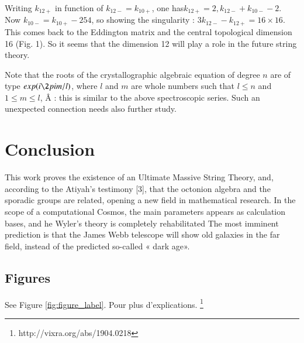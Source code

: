 \documentclass[a4paper,9pt]{article}
\begin{document}
    
    Writing $k_{12+}$ in function of $k_{12-} = k_{10+}$, one has$ k_{12+} = 2,  k_{12-} + k_{10-} - 2$. Now   $k_{10-} = k_{10+} - 254$, so showing the singularity : $3k_{12-} - k_{12+}  = 16 \times 16$. This comes back to the Eddington matrix and the central topological dimension 16 (Fig. 1). So it seems that the dimension 12 will play a role in the future string theory.
    
    
    Note that the roots of the crystallographic algebraic equation of degree $n$ are of type $exp(i\2pi m/l)$, where $l$ and $m$ are whole numbers such that $l \le n$ and $1 \le m \le l$, Â : this is similar to the above spectroscopic series. Such an unexpected connection needs also further study.


\section{Conclusion}

This work proves the existence of an Ultimate Massive String Theory, and, according to the Atiyah's testimony [3], that the octonion algebra and the sporadic groups are related, opening a new field in mathematical research. In the scope of a computational Cosmos, the main parameters appears as calculation bases, and he Wyler's theory is completely rehabilitated  The most imminent prediction is that the James Webb telescope will show old galaxies in the far field, instead of the predicted so-called « dark age».


\subsection{Figures}

See Figure \ref{fig:figure_label}. Pour plus d'explications. \footnote{http://vixra.org/abs/1904.0218}
 
\end{document}
